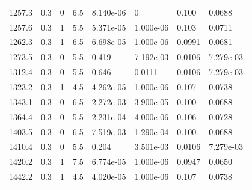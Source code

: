 \documentclass[preview]{standalone}
\begin{document}
{{{\begin{tabular}{L{1.2cm}C{1.2cm} C{0.3cm}C{0.5cm} C{1.4cm}C{1.4cm} C{1.4cm}C{1.4cm}}
  1257.3  &   0.3  & 0     & 6.5 &  8.140e-06  & 0  & 0.100 &  0.0688   \\ 
  1257.6  &   0.3  & 1     & 5.5 &  5.371e-05  & 1.000e-06  & 0.103 &  0.0711   \\ 
  1262.3  &   0.3  & 1     & 6.5 &  6.698e-05  & 1.000e-06  & 0.0991 &  0.0681   \\ 
  1273.5  &   0.3  & 0     & 5.5 &  0.419  & 7.192e-03  & 0.0106 &  7.279e-03   \\ 
  1312.4  &   0.3  & 0     & 5.5 &  0.646  & 0.0111  & 0.0106 &  7.279e-03   \\ 
  1323.2  &   0.3  & 1     & 4.5 &  4.262e-05  & 1.000e-06  & 0.107 &  0.0738   \\ 
  1343.1  &   0.3  & 0     & 6.5 &  2.272e-03  & 3.900e-05  & 0.100 &  0.0688   \\ 
  1364.4  &   0.3  & 0     & 5.5 &  2.231e-04  & 4.000e-06  & 0.106 &  0.0728   \\ 
  1403.5  &   0.3  & 0     & 6.5 &  7.519e-03  & 1.290e-04  & 0.100 &  0.0688   \\ 
  1410.4  &   0.3  & 0     & 5.5 &  0.204  & 3.501e-03  & 0.0106 &  7.279e-03   \\ 
  1420.2  &   0.3  & 1     & 7.5 &  6.774e-05  & 1.000e-06  & 0.0947 &  0.0650   \\ 
  1442.2  &   0.3  & 1     & 4.5 &  4.020e-05  & 1.000e-06  & 0.107 &  0.0738   \\ 
\hline 
\end{tabular} 

}}}
\end{document}
